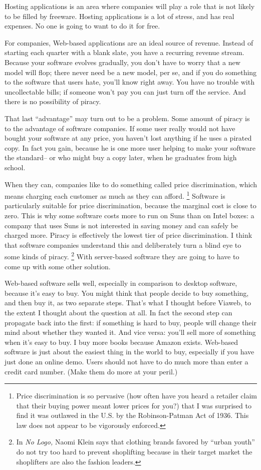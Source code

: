 Hosting applications is an area where companies will play a role that is
not likely to be filled by freeware. Hosting applications is a lot of
stress, and has real expenses. No one is going to want to do it for
free.

For companies, Web-based applications are an ideal source of revenue.
Instead of starting each quarter with a blank slate, you have a
recurring revenue stream. Because your software evolves gradually, you
don't have to worry that a new model will flop; there never need be a
new model, per se, and if you do something to the software that users
hate, you'll know right away. You have no trouble with uncollectable
bills; if someone won't pay you can just turn off the service. And there
is no possibility of piracy.

That last ``advantage'' may turn out to be a problem. Some amount of
piracy is to the advantage of software companies. If some user really
would not have bought your software at any price, you haven't lost
anything if he uses a pirated copy. In fact you gain, because he is one
more user helping to make your software the standard-- or who might buy
a copy later, when he graduates from high school.

When they can, companies like to do something called price
discrimination, which means charging each customer as much as they can
afford. \footnote{Price discrimination is so pervasive (how often have you heard a
retailer claim that their buying power meant lower prices for you?) that
I was surprised to find it was outlawed in the U.S. by the
Robinson-Patman Act of 1936. This law does not appear to be vigorously
enforced.} Software is particularly suitable for price
discrimination, because the marginal cost is close to zero. This is why
some software costs more to run on Suns than on Intel boxes: a company
that uses Suns is not interested in saving money and can safely be
charged more. Piracy is effectively the lowest tier of price
discrimination. I think that software companies understand this and
deliberately turn a blind eye to some kinds of piracy. \footnote{In \emph{No Logo,} Naomi Klein says that clothing brands favored
by ``urban youth'' do not try too hard to prevent shoplifting because in
their target market the shoplifters are also the fashion leaders.} With
server-based software they are going to have to come up with some other
solution.

Web-based software sells well, especially in comparison to desktop
software, because it's easy to buy. You might think that people decide
to buy something, and then buy it, as two separate steps. That's what I
thought before Viaweb, to the extent I thought about the question at
all. In fact the second step can propagate back into the first: if
something is hard to buy, people will change their mind about whether
they wanted it. And vice versa: you'll sell more of something when it's
easy to buy. I buy more books because Amazon exists. Web-based software
is just about the easiest thing in the world to buy, especially if you
have just done an online demo. Users should not have to do much more
than enter a credit card number. (Make them do more at your peril.)

